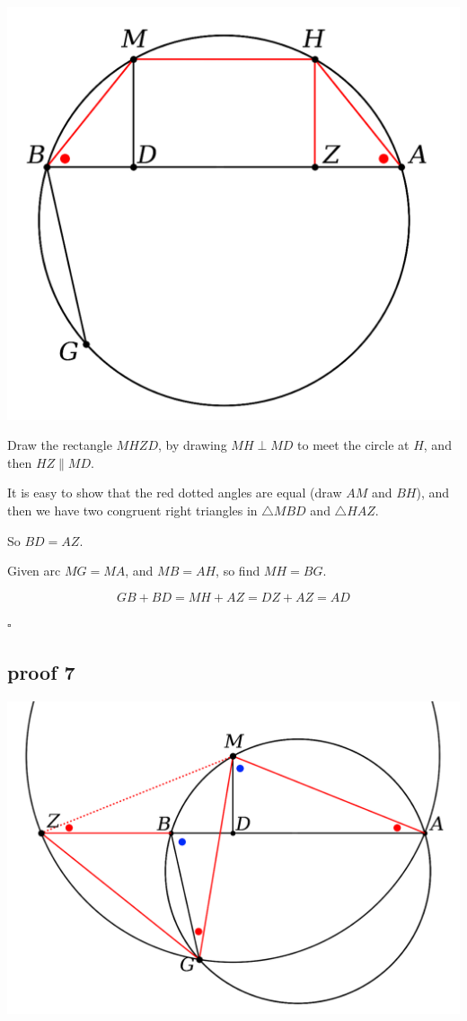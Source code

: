 \documentclass[11pt, oneside]{article}
\begin{document}
\begin{center} \includegraphics [scale=0.40] {bc6.png} \end{center}

Draw the rectangle $MHZD$, by drawing $MH \perp MD$ to meet the circle at $H$, and then $HZ \parallel MD$.

It is easy to show that the red dotted angles are equal (draw $AM$ and $BH$), and then we have two congruent right triangles in $\triangle MBD$ and $\triangle HAZ$.

So $BD = AZ$.

Given arc $MG = MA$, and $MB = AH$, so find $MH = BG$.

\[ GB + BD = MH + AZ = DZ + AZ = AD \]

$\square$

\newpage

\subsection*{proof 7}

\begin{center} \includegraphics [scale=0.40] {bc7.png} \end{center}
\end{document}

